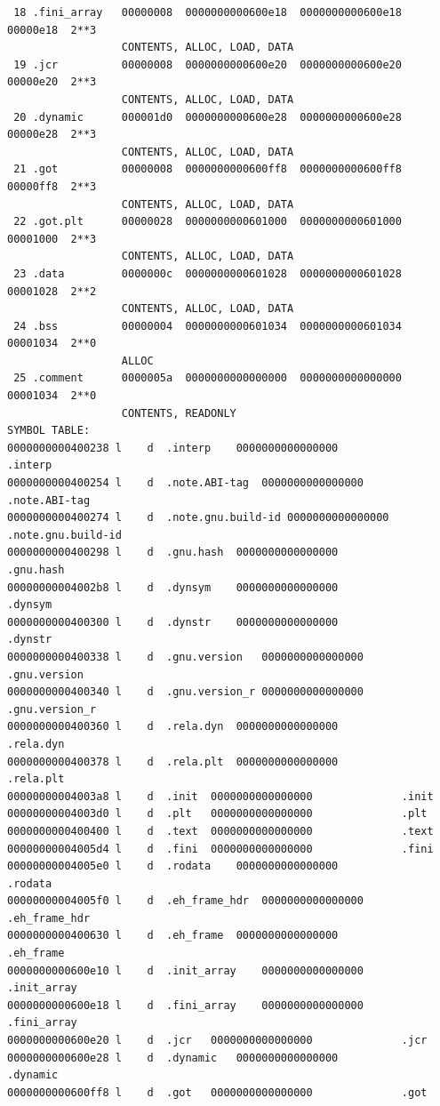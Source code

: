 \documentclass[11pt]{article}
\begin{document}
\begin{enumerate}
\begin{verbatim}
 18 .fini_array   00000008  0000000000600e18  0000000000600e18  00000e18  2**3
                  CONTENTS, ALLOC, LOAD, DATA
 19 .jcr          00000008  0000000000600e20  0000000000600e20  00000e20  2**3
                  CONTENTS, ALLOC, LOAD, DATA
 20 .dynamic      000001d0  0000000000600e28  0000000000600e28  00000e28  2**3
                  CONTENTS, ALLOC, LOAD, DATA
 21 .got          00000008  0000000000600ff8  0000000000600ff8  00000ff8  2**3
                  CONTENTS, ALLOC, LOAD, DATA
 22 .got.plt      00000028  0000000000601000  0000000000601000  00001000  2**3
                  CONTENTS, ALLOC, LOAD, DATA
 23 .data         0000000c  0000000000601028  0000000000601028  00001028  2**2
                  CONTENTS, ALLOC, LOAD, DATA
 24 .bss          00000004  0000000000601034  0000000000601034  00001034  2**0
                  ALLOC
 25 .comment      0000005a  0000000000000000  0000000000000000  00001034  2**0
                  CONTENTS, READONLY
SYMBOL TABLE:
0000000000400238 l    d  .interp	0000000000000000              .interp
0000000000400254 l    d  .note.ABI-tag	0000000000000000              .note.ABI-tag
0000000000400274 l    d  .note.gnu.build-id	0000000000000000              .note.gnu.build-id
0000000000400298 l    d  .gnu.hash	0000000000000000              .gnu.hash
00000000004002b8 l    d  .dynsym	0000000000000000              .dynsym
0000000000400300 l    d  .dynstr	0000000000000000              .dynstr
0000000000400338 l    d  .gnu.version	0000000000000000              .gnu.version
0000000000400340 l    d  .gnu.version_r	0000000000000000              .gnu.version_r
0000000000400360 l    d  .rela.dyn	0000000000000000              .rela.dyn
0000000000400378 l    d  .rela.plt	0000000000000000              .rela.plt
00000000004003a8 l    d  .init	0000000000000000              .init
00000000004003d0 l    d  .plt	0000000000000000              .plt
0000000000400400 l    d  .text	0000000000000000              .text
00000000004005d4 l    d  .fini	0000000000000000              .fini
00000000004005e0 l    d  .rodata	0000000000000000              .rodata
00000000004005f0 l    d  .eh_frame_hdr	0000000000000000              .eh_frame_hdr
0000000000400630 l    d  .eh_frame	0000000000000000              .eh_frame
0000000000600e10 l    d  .init_array	0000000000000000              .init_array
0000000000600e18 l    d  .fini_array	0000000000000000              .fini_array
0000000000600e20 l    d  .jcr	0000000000000000              .jcr
0000000000600e28 l    d  .dynamic	0000000000000000              .dynamic
0000000000600ff8 l    d  .got	0000000000000000              .got

\end{verbatim}
\end{enumerate}
\end{document}
